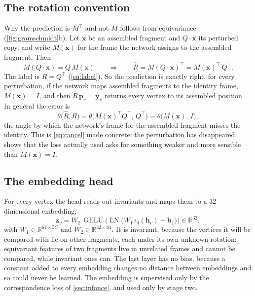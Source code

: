 \documentclass[11pt,a4paper]{article}
\theoremstyle{remark}
\newcommand{\R}{\mathbb{R}}
\newcommand{\x}{\mathbf{x}}
\newcommand{\y}{\mathbf{y}}
\newcommand{\z}{\mathbf{z}}
\newcommand{\T}{^{\top}}
\DeclareMathOperator{\LN}{LN}
\begin{document}
\subsection{The rotation convention}
\label{sec:convention}
Why the prediction is $M\T$ and not $M$ follows from equivariance (\cref{fig:gramschmidt}b). Let $\x$ be an assembled fragment and $Q\cdot\x$ its perturbed copy, and write $M(\x)$ for the frame the network assigns to the assembled fragment. Then
\begin{equation}
  M(Q\cdot\x)=Q\,M(\x)\qquad\Longrightarrow\qquad
  \hat R=M(Q\cdot\x)\T=M(\x)\T\,Q\T .
  \label{eq:convention}
\end{equation}
The label is $R=Q\T$ (\cref{eq:label}). So the prediction is exactly right, for every perturbation, if the network maps assembled fragments to the identity frame, $M(\x)=I$, and then $\hat R\,\tilde{\mathbf p}_v=\y_v$ returns every vertex to its assembled position. In general the error is
\begin{equation}
  \theta\big(\hat R,R\big)=\theta\big(M(\x)\T Q\T,\,Q\T\big)=\theta\big(M(\x),\,I\big),
  \label{eq:abserror}
\end{equation}
the angle by which the network's frame for the assembled fragment misses the identity. This is \cref{eq:cancel} made concrete: the perturbation has disappeared.  shows that the loss actually used asks for something weaker and more sensible than $M(\x)=I$.

\subsection{The embedding head}
\label{sec:embhead}
For every vertex the head reads out invariants and maps them to a 32-dimensional embedding,
\begin{equation}
  \z_v=W_2\,\operatorname{GELU}\Big(\LN\big(W_1\,\iota_4(\mathbf h_v)+\mathbf b_1\big)\Big)\in\R^{32},
\end{equation}
with $W_1\in\R^{64\times5C}$ and $W_2\in\R^{32\times64}$. It is invariant, because the vertices it will be compared with lie on other fragments, each under its own unknown rotation: equivariant features of two fragments live in unrelated frames and cannot be compared, while invariant ones can. The last layer has no bias, because a constant added to every embedding changes no distance between embeddings and so could never be learned. The embedding is supervised only by the correspondence loss of \cref{sec:infonce}, and used only by stage two.
\end{document}
